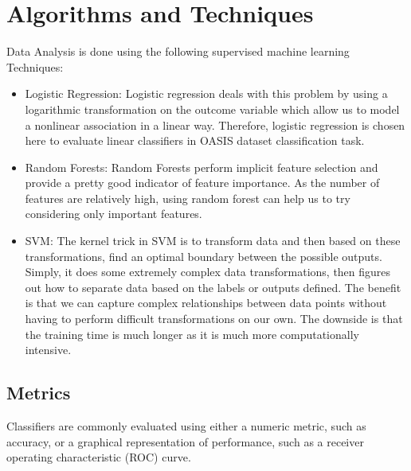 \section{Algorithms and Techniques}
\label{sec:Alg}
Data Analysis is done using the following supervised machine learning Techniques:

\begin{itemize}
	\item Logistic Regression:
	Logistic regression deals with this problem by using a 
	logarithmic transformation on the outcome variable 
	which allow us to model a nonlinear association in a 
	linear way. Therefore, logistic regression is chosen here to evaluate linear classifiers in OASIS dataset classification task.
	
	\item Random Forests: Random Forests perform implicit feature selection and provide a pretty good indicator of feature importance. As the number of features are relatively high, using random forest can help us to try considering only important features.
	
	\item SVM: The kernel trick in SVM is to transform data and then based on these transformations, find an optimal boundary between the possible outputs. Simply, it does some extremely complex data transformations, then figures out how to separate data based on the labels or outputs defined. The benefit is that we can capture complex relationships between data points without having to perform difficult transformations on our own. The downside is that the training time is much longer as it is much more computationally intensive.
\end{itemize}


\subsection{Metrics}
Classifiers are commonly evaluated using either a numeric metric, such as accuracy, or a graphical representation of performance, such as a receiver operating characteristic (ROC) curve.

